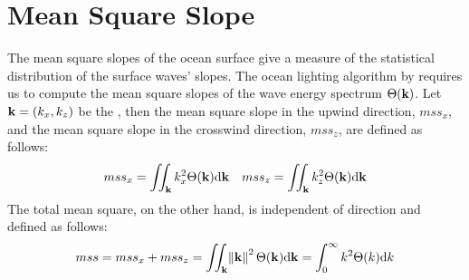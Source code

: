 \section{Mean Square Slope}
\label{app:mss}
%
The mean square slopes of the ocean surface give a measure of the
statistical distribution of the surface waves' slopes. The ocean lighting
algorithm by \cite{misc:oceanlightingfft} requires us to compute
the mean square slopes of the wave energy spectrum $\Theta(\mathbf{k})$.
Let $\mathbf{k} = (k_x, k_z)$ be the \wavevector,
then the mean square slope in the upwind direction, $mss_x$, and the mean square
slope in the crosswind direction, $mss_z$, are defined as follows:
\begin{align}
mss_x = \iint_{\mathbf{k}} k_x^2 \Theta(\mathbf{k}) \mathrm{d}\mathbf{k} &&
mss_z = \iint_{\mathbf{k}} k_z^2 \Theta(\mathbf{k}) \mathrm{d}\mathbf{k}
\end{align}
%
The total mean square, on the other hand, is independent of direction
and defined as follows:
\begin{equation}
mss = mss_x + mss_z = \iint_{\mathbf{k}} \norm{\mathbf{k}}^2 \Theta(\mathbf{k}) \mathrm{d}\mathbf{k} = \int_{0}^{\infty}k^2 \Theta(k)\mathrm{d}k
\end{equation}